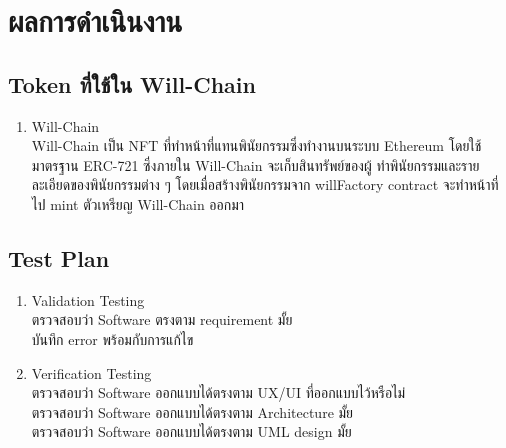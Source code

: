 \documentclass[12pt,oneside,openright,a4paper]{cpe-thai-project}
\begin{document}
\chapter{ผลการดําเนินงาน}
\section{Token ที่ใช้ใน Will-Chain}
\begin{enumerate}[label=\thesection.\arabic*,leftmargin=0pt,itemindent=1.25cm]
		\item Will-Chain \\
			\tab \tab Will-Chain เป็น NFT ที่ทำหน้าที่แทนพินัยกรรมซึ่งทำงานบนระบบ Ethereum โดยใช้มาตรฐาน ERC-721 ซึ่งภายใน Will-Chain จะเก็บสินทรัพย์ของผู้
ทำพินัยกรรมและรายละเอียดของพินัยกรรมต่าง ๆ โดยเมื่อสร้างพินัยกรรมจาก willFactory contract จะทำหน้าที่ไป mint ตัวเหรียญ Will-Chain ออกมา
	\end{enumerate}
\section{Test Plan}
\begin{enumerate}[label=\thesection.\arabic*,leftmargin=0pt,itemindent=1.25cm]
\item Validation Testing \\
\tab \tab ตรวจสอบว่า Software ตรงตาม requirement มั้ย\\
\tab \tab บันทึก error พร้อมกับการแก้ไข\\
\item Verification Testing \\
\tab \tab ตรวจสอบว่า Software ออกแบบได้ตรงตาม UX/UI ที่ออกแบบไว้หรือไม่\\
\tab \tab ตรวจสอบว่า Software ออกแบบได้ตรงตาม Architecture มั้ย\\
\tab \tab ตรวจสอบว่า Software ออกแบบได้ตรงตาม UML design มั้ย\\
\end{enumerate}
\clearpage
\end{document}
